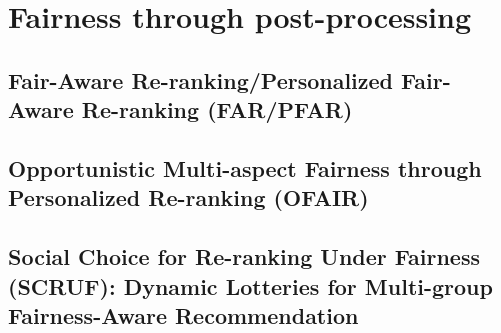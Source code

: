 \chapter{Fairness through post-processing}
\label{fairness_postproc}


\section{Fair-Aware Re-ranking/Personalized Fair-Aware Re-ranking (FAR/PFAR)}
    
    

\section{Opportunistic Multi-aspect Fairness through Personalized Re-ranking (OFAIR)}
    
    
\section{Social Choice for Re-ranking Under Fairness (SCRUF): Dynamic Lotteries for Multi-group Fairness-Aware Recommendation}

